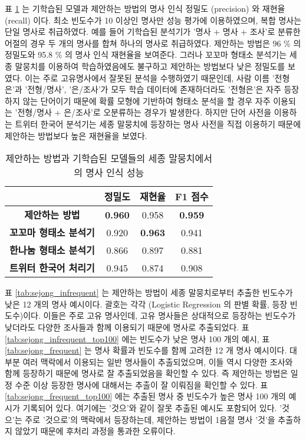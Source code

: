 \documentclass[oneside, ko,phd]{snuthesis_utf8_kor}
\begin{document}
표 \ref{tab:sejong_performance} 는 기학습된 모델과 제안하는 방법의 명사 인식 정밀도 (precision) 와 재현율 (recall) 이다.
최소 빈도수가 10 이상인 명사만 성능 평가에 이용하였으며, 복합 명사는 단일 명사로 취급하였다.
예를 들어 기학습된 분석기가 '명사 + 명사 + 조사'로 분류한 어절의 경우 두 개의 명사를 합쳐 하나의 명사로 취급하였다.
제안하는 방법은 96 \% 의 정밀도와 95.8 \% 의 명사 인식 재현율을 보여준다.
그러나 꼬꼬마 형태소 분석기는 세종 말뭉치를 이용하여 학습하였음에도 불구하고 제안하는 방법보다 낮은 정밀도를 보였다.
이는 주로 고유명사에서 잘못된 분석을 수행하였기 때문인데, 사람 이름 '전형은'과 '전형/명사', '은/조사'가 모두 학습 데이터에 존재하더라도 '전형은'은 자주 등장하지 않는 단어이기 때문에 확률 모형에 기반하여 형태소 분석을 할 경우 자주 이용되는 '전형/명사 + 은/조사'로 오분류하는 경우가 발생한다.
하지만 단어 사전을 이용하는 트위터 한국어 분석기는 세종 말뭉치에 등장하는 명사 사전을 직접 이용하기 때문에 제안하는 방법보다 높은 재현율을 보였다.

\begin{table}[ht]
\centering
\caption{제안하는 방법과 기학습된 모델들의 세종 말뭉치에서의 명사 인식 성능}
\label{tab:sejong_performance}
\begin{tabular}{|
>{}c |c|c|c|}\hline
& \textbf{정밀도} & \textbf{재현율} & \textbf{F1 점수} \\ \hline
\textbf{제안하는 방법} & {\textbf{0.960}} & 0.958 & { \textbf{0.959}} \\ \hline
\textbf{꼬꼬마 형태소 분석기} & 0.920 & { \textbf{0.963}} & 0.941 \\ \hline
\textbf{한나눔 형태소 분석기} & 0.866 & 0.897 & 0.881 \\ \hline
\textbf{트위터 한국어 처리기} & 0.945 & 0.874 & 0.908 \\ \hline
\end{tabular}%
\end{table}

표 \ref{tab:sejong_infrequent} 는 제안하는 방법이 세종 말뭉치로부터 추출한 빈도수가 낮은 12 개의 명사 예시이다.
괄호는 각각 (Logistic Regression 의 판별 확률, 등장 빈도수)이다.
이들은 주로 고유 명사인데, 고유 명사들은 상대적으로 등장하는 빈도수가 낮더라도 다양한 조사들과 함께 이용되기 때문에 명사로 추출되었다.
표 \ref{tab:sejong_infrequent_top100} 에는 빈도수가 낮은 명사 100 개의 예시, 표 \ref{tab:sejong_frequent} 는 명사 확률과 빈도수를 함께 고려한 12 개 명사 예시이다.
대부분 여러 맥락에서 이용되는 일반 명사들이 추출되었으며, 이들 역시 다양한 조사와 함께 등장하기 때문에 명사로 잘 추출되었음을 확인할 수 있다.
즉 제안하는 방법은 일정 수준 이상 등장한 명사에 대해서는 추출이 잘 이뤄짐을 확인할 수 있다.
표 \ref{tab:sejong_frequent_top100} 에는 추출된 명사 중 빈도수가 높은 명사 100 개의 예시가 기록되어 있다.
여기에는 '것으'와 같이 잘못 추출된 예시도 포함되어 있다.
'것으'는 주로 '것으로'의 맥락에서 등장하는데, 제안하는 방법이 1음절 명사 '것'을 추출하지 않았기 때문에 후처리 과정을 통과한 오류이다.
\end{document}
